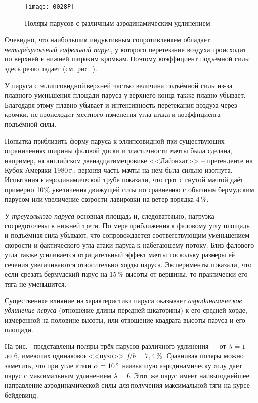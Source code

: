 \begin{figure}[!htb]
  \centering
  \texttt{[image: 0028P]}
  \caption{Поляры парусов с различным аэродинамическим удлинением}
  \label{fig:28}
\end{figure}

Очевидно, что наибольшим индуктивным сопротивлением обладает
\textit{четырёхугольный гафельный парус}, у
которого перетекание воздуха происходит по верхней и нижней широким
кромкам. Поэтому коэффициент подъёмной силы здесь резко падает
(см. рис.~).

У паруса с эллипсовидной верхней частью величина подъёмной силы из-за
плавного уменьшения площади паруса у верхнего конца также плавно
убывает. Благодаря этому плавно убывает и интенсивность перетекания
воздуха через кромки, не происходит местного изменения угла атаки и
коэффициента подъёмной силы.

Попытка приблизить форму паруса к эллипсовидной при существующих
ограничениях ширины фаловой доски и эластичности мачты была сделана,
например, на английском двенадцатиметровике <<Лайонхат>> \---
претенденте на Кубок Америки 1980\,г.: верхняя часть мачты на нем была
сильно изогнута. Испытания в аэродинамической трубе показали, что грот
с гнутой мачтой даёт примерно 10\,\% увеличения движущей силы
по сравнению с обычным бермудским парусом или увеличение скорости
лавировки на ветер порядка 4\,\%.
 
У \textit{треугольного паруса} основная площадь и,
следовательно, нагрузка сосредоточены в нижней трети. По мере
приближения к фаловому углу площадь и подъёмная сила убывают, что
сопровождается соответствующим уменьшением скорости и фактического
угла атаки паруса к набегающему потоку. Близ фалового угла также
усиливается отрицательный эффект мачты поскольку размеры её сечения
увеличиваются относительно хорды паруса. Эксперименты показали, что
если срезать бермудский парус на 15\,\% высоты от вершины, то
практически его тяга не уменьшится.

Существенное влияние на характеристики паруса оказывает
\textit{аэродинамическое удлинение паруса}
(отношение длины передней шкаторины) к его средней хорде,
измеренной на половине высоты, или отношение квадрата высоты паруса и
его площади.

На рис.~ представлены поляры трёх парусов различного удлинения
--- от $\lambda = 1$ до 6, имеющих одинаковое <<пузо>>
$f/b=7,4\,\%$. Сравнивая поляры можно заметить, что при угле атаки
$\alpha = 10\,^\circ$ наивысшую аэродинамическу силу дает парус с
максимальным удлинением $\lambda = 6$. Этот же парус имеет
наивыгоднейшее направление аэродинамической силы для получения
максимальной тяги на курсе бейдевинд.

